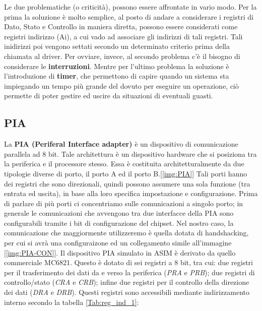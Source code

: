 Le due problematiche (o criticità), possono essere affrontate in vario modo. Per la prima la soluzione è molto semplice, al posto di andare a considerare i registri di Dato, Stato e Controllo in maniera diretta, possono essere considerati come registri indirizzo (Ai), a cui vado ad associare gli indirizzi di tali registri. Tali inidirizzi poi vengono settati secondo un determinato criterio prima della chiamata al driver.
Per ovviare, invece, al secondo problema c'è il bisogno di considerare le \textbf{interruzioni}. Mentre per l'ultimo problema la soluzione è l'introduzione di \textbf{timer}, che permettono di capire quando un sistema sta impiegando un tempo più grande del dovuto per eseguire un operazione, ciò permette di poter gestire ed uscire da situazioni di eventuali guasti.

\subsection{PIA} \label{par:PIA}

La \textbf{PIA (Periferal Interface adapter)} è un dispositivo di comunicazione parallela ad 8 bit. Tale architettura è un dispositivo hardware che si posiziona tra la periferica e il processore stesso. Essa è costituita architetturalmente da due tipologie diverse di porto, il porto A ed il porto B.[\ref{img:PIA}]
Tali porti hanno dei registri che sono direzionali, quindi possono assumere una sola funzione (tra entrata ed uscita), in base alla loro specifica impostazione e configurazione.
Prima di parlare di più porti ci concentriamo sulle comunicazioni a singolo porto; in generale le comunicazioni che avvengono tra due interfacce della PIA sono configurabili tramite i bit di configurazione del chipset. Nel nostro caso, la comunicazione che maggiormente utilizzeremo è quella dotata di handshacking, per cui si avrà una configuraizone ed un collegamento simile all'immagine [\ref{img:PIA-CON}].
Il dispositivo PIA simulato in ASIM è derivato da quello commerciale MC6821. Questo è dotato di sei registri a 8 bit, tra cui: due registri per il trasferimento dei dati da e verso la periferica (\textit{PRA} e \textit{PRB}); due registri di controllo/stato (\textit{CRA} e \textit{CRB}); infine due registri per il controllo della direzione dei dati (\textit{DRA} e \textit{DRB}). Questi registri sono accessibili mediante indirizzamento interno secondo la tabella \ref{Tab:reg_ind_1}:

